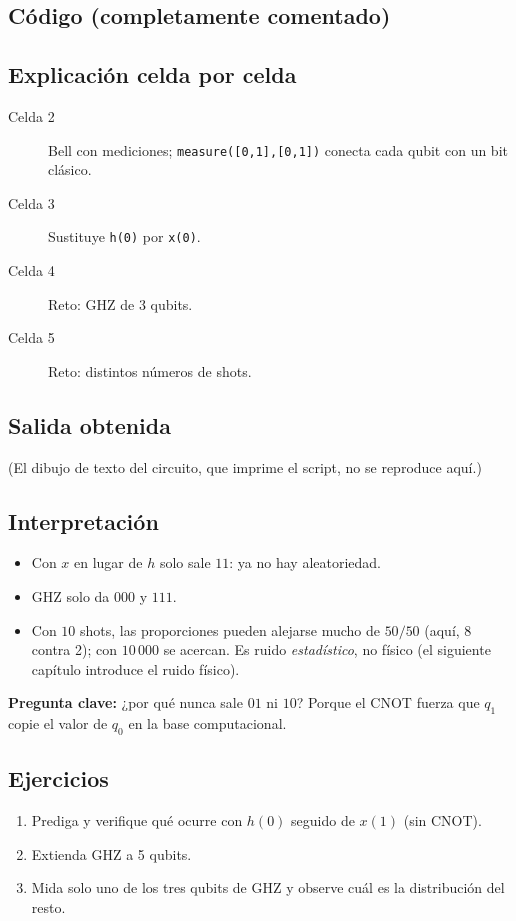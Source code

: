 \subsection{Código (completamente comentado)}


\subsection{Explicación celda por celda}
\begin{description}
  \item[Celda 2] Bell con mediciones; \texttt{measure([0,1],[0,1])} conecta
    cada qubit con un bit clásico.
  \item[Celda 3] Sustituye \texttt{h(0)} por \texttt{x(0)}.
  \item[Celda 4] Reto: GHZ de 3 qubits.
  \item[Celda 5] Reto: distintos números de shots.
\end{description}

\subsection{Salida obtenida}

(El dibujo de texto del circuito, que imprime el script, no se reproduce aquí.)

\subsection{Interpretación}
\begin{itemize}
  \item Con $x$ en lugar de $h$ solo sale $11$: ya no hay aleatoriedad.
  \item GHZ solo da $000$ y $111$.
  \item Con $10$ shots, las proporciones pueden alejarse mucho de $50/50$
    (aquí, 8 contra 2); con $10\,000$ se acercan. Es ruido \emph{estadístico},
    no físico (el siguiente capítulo introduce el ruido físico).
\end{itemize}
\textbf{Pregunta clave:} ¿por qué nunca sale $01$ ni $10$? Porque el CNOT
fuerza que $q_1$ copie el valor de $q_0$ en la base computacional.

\subsection{Ejercicios}
\begin{enumerate}
  \item Prediga y verifique qué ocurre con $h(0)$ seguido de $x(1)$ (sin CNOT).
  \item Extienda GHZ a 5 qubits.
  \item Mida solo uno de los tres qubits de GHZ y observe cuál es la
    distribución del resto.
\end{enumerate}


